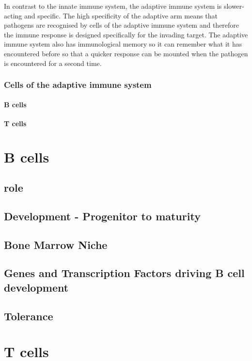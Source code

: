 In contrast to the innate immune system, the adaptive immune system is slower-acting and specific.
The high specificity of the adaptive arm means that pathogens are recognised by cells of the adaptive immune system and therefore the immune response is designed specifically for the invading target.
The adaptive immune system also has immunological memory so it can remember what it has encountered before so that a quicker response can be mounted when the pathogen is encountered for a second time.

\subsubsection{Cells of the adaptive immune system}
\paragraph{B cells}
\paragraph{T cells}



\section{B cells}
\subsection{role}
\subsection{Development - Progenitor to maturity}
\subsection{Bone Marrow Niche}
\subsection{Genes and Transcription Factors driving B cell development}
\subsection{Tolerance}

\section{T cells}
